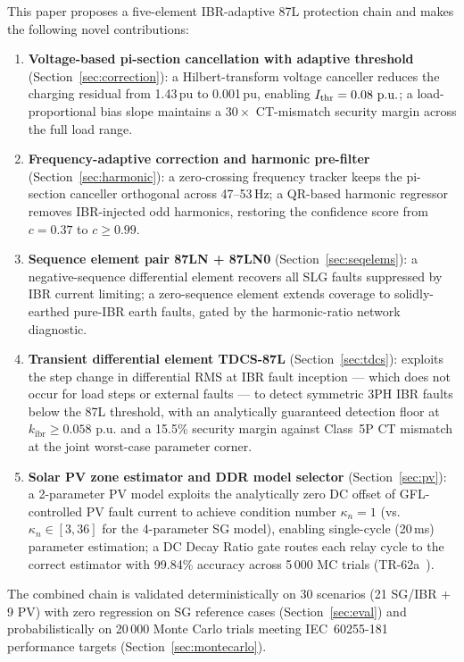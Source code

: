 \documentclass[journal,twoside,10pt]{IEEEtran}
\newcommand{\kibr}{k_{\mathrm{ibr}}}
\newcommand{\kn}{\kappa_n}
\newcommand{\pu}{\,\text{p.u.}}
\begin{document}
This paper proposes a five-element IBR-adaptive 87L protection chain and
makes the following novel contributions:
\begin{enumerate}
  \item \textbf{Voltage-based pi-section cancellation with adaptive threshold}
        (Section~\ref{sec:correction}): a Hilbert-transform voltage canceller
        reduces the charging residual from 1.43\,pu to 0.001\,pu, enabling
        $I_{\rm thr} = 0.08\,\pu$; a load-proportional bias slope maintains
        a $30\times$ CT-mismatch security margin across the full load range.
  \item \textbf{Frequency-adaptive correction and harmonic pre-filter}
        (Section~\ref{sec:harmonic}): a zero-crossing frequency tracker
        keeps the pi-section canceller orthogonal across 47--53\,Hz; a
        QR-based harmonic regressor removes IBR-injected odd harmonics,
        restoring the confidence score from $c = 0.37$ to $c \geq 0.99$.
  \item \textbf{Sequence element pair 87LN + 87LN0}
        (Section~\ref{sec:seqelems}): a negative-sequence differential element
        recovers all SLG faults suppressed by IBR current limiting; a
        zero-sequence element extends coverage to solidly-earthed pure-IBR
        earth faults, gated by the harmonic-ratio network diagnostic.
  \item \textbf{Transient differential element TDCS-87L}
        (Section~\ref{sec:tdcs}): exploits the step change in differential
        RMS at IBR fault inception --- which does not occur for load steps
        or external faults --- to detect symmetric 3PH IBR faults below the
        87L threshold, with an analytically guaranteed detection floor at
        $\kibr \geq 0.058\,\pu$ and a 15.5\% security margin against
        Class~5P CT mismatch at the joint worst-case parameter corner.
  \item \textbf{Solar PV zone estimator and DDR model selector}
        (Section~\ref{sec:pv}): a 2-parameter PV model exploits the
        analytically zero DC offset of GFL-controlled PV fault current to
        achieve condition number $\kn = 1$ (vs.\ $\kn \in [3,36]$ for the
        4-parameter SG model), enabling single-cycle (20\,ms) parameter
        estimation; a DC Decay Ratio gate routes each relay cycle to the
        correct estimator with 99.84\% accuracy across 5\,000 MC trials
        (TR-62a~\cite{SAMBP_TR62}).
\end{enumerate}

The combined chain is validated deterministically on 30 scenarios (21 SG/IBR
+ 9 PV) with zero regression on SG reference cases (Section~\ref{sec:eval})
and probabilistically on 20\,000 Monte Carlo trials meeting IEC~60255-181
performance targets (Section~\ref{sec:montecarlo}).
\end{document}
